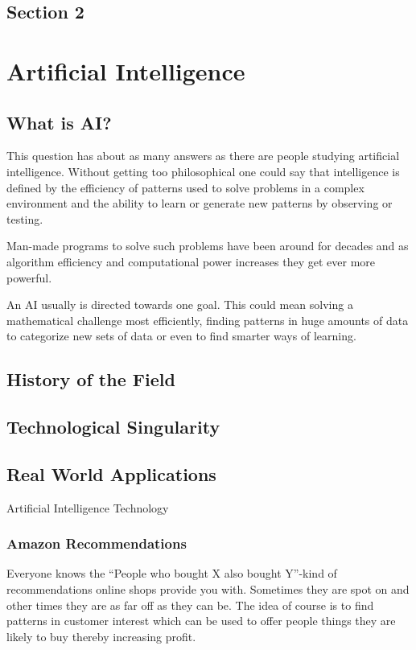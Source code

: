 
\section{Section 2}


\chapter{Artificial Intelligence}
\section{What is AI?}

This question has about as many answers as there are people studying artificial intelligence. Without getting too philosophical one could say that intelligence is defined by the efficiency of patterns used to solve problems in a complex environment and the ability to learn or generate new patterns by observing or testing.

Man-made programs to solve such problems have been around for decades and as algorithm efficiency and computational power increases they get ever more powerful.

An AI usually is directed towards one goal. This could mean solving a mathematical challenge most efficiently, finding patterns in huge amounts of data to categorize new sets of data or even to find smarter ways of learning.


\section{History of the Field}

\section{Technological Singularity}

\newpage
\section{Real World Applications}

Artificial Intelligence Technology 

\subsection{Amazon Recommendations}
Everyone knows the ``People who bought X also bought Y''-kind of recommendations online shops provide you with. Sometimes they are spot on and other times they are as far off as they can be. The idea of course is to find patterns in customer interest which can be used to offer people things they are likely to buy thereby increasing profit.

